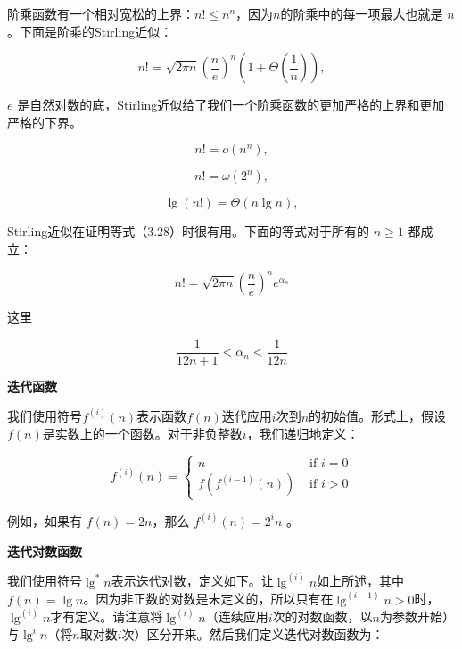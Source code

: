 \documentclass[lang=cn,newtx,10pt,scheme=chinese]{elegantbook}
\begin{document}
阶乘函数有一个相对宽松的上界：$n ! \leq n^n$，因为$n$的阶乘中的每一项最大也就是 $n$。下面是阶乘的Stirling近似：

\begin{equation}
n !=\sqrt{2 \pi n}\left(\frac{n}{e}\right)^n\left(1+\Theta\left(\frac{1}{n}\right)\right),
\end{equation}

$e$ 是自然对数的底，Stirling近似给了我们一个阶乘函数的更加严格的上界和更加严格的下界。

\begin{equation}
n!=o\left(n^n\right),
\end{equation}

\begin{equation}
n!=\omega\left(2^n\right),
\end{equation}

\begin{equation}
\lg (n!)=\Theta(n \lg n),
\end{equation}

Stirling近似在证明等式（3.28）时很有用。下面的等式对于所有的 $n \geq 1$ 都成立：

\begin{equation}
n !=\sqrt{2 \pi n}\left(\frac{n}{e}\right)^n e^{\alpha_n}
\end{equation}

这里

$$
\frac{1}{12 n+1}<\alpha_n<\frac{1}{12 n}
$$

\textbf{迭代函数}

我们使用符号$f^{(i)}(n)$表示函数$f(n)$迭代应用$i$次到$n$的初始值。形式上，假设$f(n)$是实数上的一个函数。对于非负整数$i$，我们递归地定义：

\begin{equation}
f^{(i)}(n)= \begin{cases}n & \text { if } i=0 \\ f\left(f^{(i-1)}(n)\right) & \text { if } i>0\end{cases}
\end{equation}

例如，如果有 $f(n)=2 n$，那么 $f^{(i)}(n)=2^i n$ 。

\textbf{迭代对数函数}

我们使用符号$\lg ^* n$表示迭代对数，定义如下。让$\lg ^{(i)} n$如上所述，其中$f(n)=\lg n$。因为非正数的对数是未定义的，所以只有在$\lg ^{(i-1)} n>0$时，$\lg ^{(i)} n$才有定义。请注意将$\lg ^{(i)} n$（连续应用$i$次的对数函数，以$n$为参数开始）与$\lg ^i n$（将$n$取对数$i$次）区分开来。然后我们定义迭代对数函数为：
\end{document}
